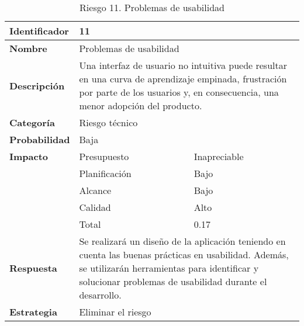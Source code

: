\begin{table}[H]
    \centering
    \caption{Riesgo 11. Problemas de usabilidad}
    \label{table:risk_usabilidad}
    \begin{tabular}{>{\columncolor{lightgreen!20}}l l l}
    \toprule
    \rowcolor{lightgreen}
    \textbf{Identificador} & \multicolumn{2}{l}{11} \\
    \midrule
    \textbf{Nombre} & \multicolumn{2}{l}{Problemas de usabilidad} \\
    \midrule
    \textbf{Descripción} & \multicolumn{2}{p{10cm}}{Una interfaz de usuario no intuitiva puede resultar en una curva de aprendizaje empinada, 
    frustración por parte de los usuarios y, en consecuencia, una menor adopción del producto.} \\
    \midrule
    \textbf{Categoría} & \multicolumn{2}{l}{Riesgo técnico} \\
    \midrule
    \textbf{Probabilidad} & \multicolumn{2}{l}{Baja} \\
    \midrule
    \textbf{Impacto} & Presupuesto & Inapreciable \\
    \cmidrule(lr){2-3}
    & Planificación &  Bajo \\
    \cmidrule(lr){2-3}
    & Alcance & Bajo \\
    \cmidrule(lr){2-3}
    & Calidad & Alto \\
    \cmidrule(lr){2-3}
    & Total & 0.17 \\
    \midrule
    \textbf{Respuesta} & \multicolumn{2}{p{10cm}}{Se realizará un diseño de la aplicación teniendo en cuenta las buenas prácticas en usabilidad. Además, se utilizarán herramientas para identificar y solucionar problemas de usabilidad durante el desarrollo.} \\
    \midrule
    \textbf{Estrategia} & \multicolumn{2}{l}{Eliminar el riesgo} \\
    \bottomrule
    \end{tabular}
\end{table}

